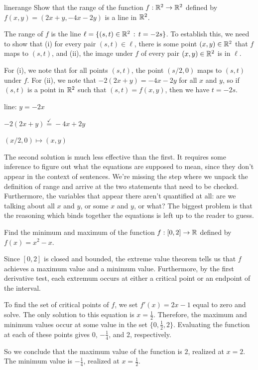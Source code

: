 \documentclass{watsonbook}
\begin{document}
\begin{example}{}{linerange} 
  Show that the range of the function $f:\mathbb{R}^2 \to \mathbb{R}^2$ defined by
  $f(x,y) = (2x + y, -4x - 2y)$ is a line in $\mathbb{R}^2$.
\end{example}

\begin{solution}[title = Good solution] 
  The range of $f$ is the line $\ell = \{(s,t) \in \mathbb{R}^2 \,: \, t =
  -2s\}$. To establish this, we need to show that (i) for every pair $(s,t) \in
  \ell$, there is some point $(x,y) \in \mathbb{R}^2$ that $f$ maps to
  $(s,t)$, and (ii), the image under $f$ of every pair $(x,y) \in
  \mathbb{R}^2$  is in $\ell$.
  
  For (i), we note that for all points $(s,t)$, the point $(s/2,0)$
  maps to $(s,t)$ under $f$. For (ii), we note that
  $-2(2x + y) = -4x - 2y$ for all $x$ and $y$, so if $(s,t)$ is a
  point in $\mathbb{R}^2$ such that $(s,t) = f(x,y)$, then we have
  $t = -2s$. 
\end{solution}

\begin{solution}[title = Solution that needs improvement] 
  line: $y = -2x$

  $-2(2x + y) \stackrel{\checkmark}{=} -4x  +2y$

  $(x/2 , 0) \mapsto (x,y)$
\end{solution}

The second solution is much less effective than the first. It requires
some inference to figure out what the equations are supposed to mean,
since they don't appear in the context of sentences. We're missing the
step where we unpack the definition of range and arrive at the two
statements that need to be checked. Furthermore, the variables that
appear there aren't quantified at all: are we talking about all $x$
and $y$, or some $x$ and $y$, or what? The biggest problem is that the
reasoning which binds together the equations is left up to the reader
to guess.

\begin{example}{}{}
  Find the minimum and maximum of the function $f: [0,2] \to \mathbb{R}$
  defined by $f(x) = x^2 - x$.
\end{example}

\begin{solution}[title=Good solution] 
  Since $[0,2]$ is closed and bounded, the extreme value theorem tells
  us that $f$ achieves a maximum value and a minimum
  value. Furthermore, by the first derivative test, each extremum
  occurs at either a critical point or an endpoint of the interval.

  To find the set of critical points of $f$, we set $f'(x) = 2x - 1$
  equal to zero and solve. The only solution to this equation is
  $x = \tfrac{1}{2}$. Therefore, the maximum and minimum values occur
  at some value in the set $\{0,\tfrac{1}{2}, 2\}$. Evaluating the
  function at each of these points gives 0, $-\tfrac{1}{4}$, and 2,
  respectively.

  So we conclude that the maximum value of the function is
  $\boxed{2}$, realized at $x=2$. The minimum value is
  $\boxed{-\tfrac{1}{4}}$, realized at $x = \tfrac{1}{2}$.
\end{solution}
\end{document}
